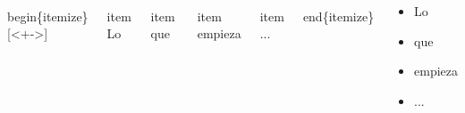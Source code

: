 \documentclass[11pt]{beamer}
\begin{document}
\begin{frame}

\begin{block}{}

\begin{columns}
\begin{semiverbatim}\scriptsize
\\begin\{itemize\}[<+->]
\end{semiverbatim}

\begin{semiverbatim}\scriptsize
 \\item Lo
\end{semiverbatim}

\begin{semiverbatim}\scriptsize
 \\item que
\end{semiverbatim}

\begin{semiverbatim}\scriptsize
 \\item empieza
\end{semiverbatim}

\begin{semiverbatim}\scriptsize
 \\item ...
\end{semiverbatim}

\begin{semiverbatim}\scriptsize
\\end\{itemize\}
\end{semiverbatim}



\begin{itemize}
\pause \item Lo  \pause \item que \pause \item empieza \pause
\item ...
\end{itemize}


\end{columns}
\end{block}






\end{frame}
\end{document}
